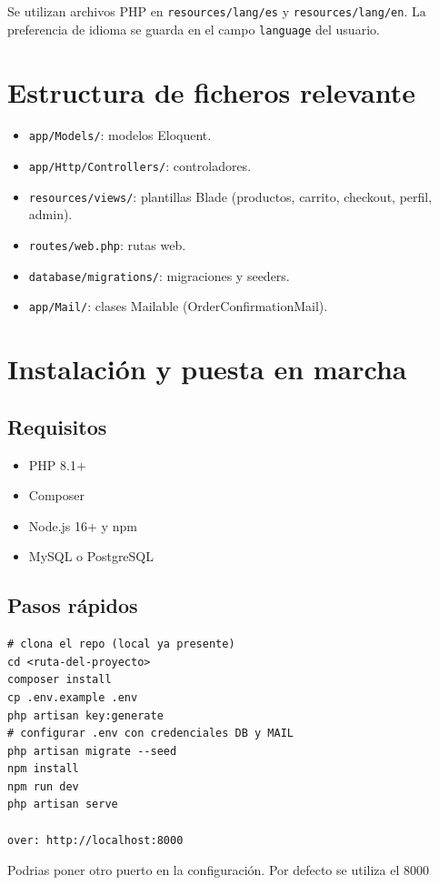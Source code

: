 \documentclass[12pt,a4paper]{report}
\begin{document}
Se utilizan archivos PHP en \texttt{resources/lang/es} y \texttt{resources/lang/en}. La preferencia de idioma se guarda en el campo \texttt{language} del usuario.

\chapter{Estructura de ficheros relevante}

\begin{itemize}
  \item \texttt{app/Models/}: modelos Eloquent.
  \item \texttt{app/Http/Controllers/}: controladores.
  \item \texttt{resources/views/}: plantillas Blade (productos, carrito, checkout, perfil, admin).
  \item \texttt{routes/web.php}: rutas web.
  \item \texttt{database/migrations/}: migraciones y seeders.
  \item \texttt{app/Mail/}: clases Mailable (OrderConfirmationMail).
\end{itemize}

\chapter{Instalación y puesta en marcha}

\section{Requisitos}

\begin{itemize}
  \item PHP 8.1+
  \item Composer
  \item Node.js 16+ y npm
  \item MySQL o PostgreSQL
\end{itemize}

\section{Pasos rápidos}

\begin{verbatim}
# clona el repo (local ya presente)
cd <ruta-del-proyecto>
composer install
cp .env.example .env
php artisan key:generate
# configurar .env con credenciales DB y MAIL
php artisan migrate --seed
npm install
npm run dev
php artisan serve

over: http://localhost:8000
\end{verbatim}
Podrias poner otro puerto en la configuración. Por defecto se utiliza el 8000
\end{document}
